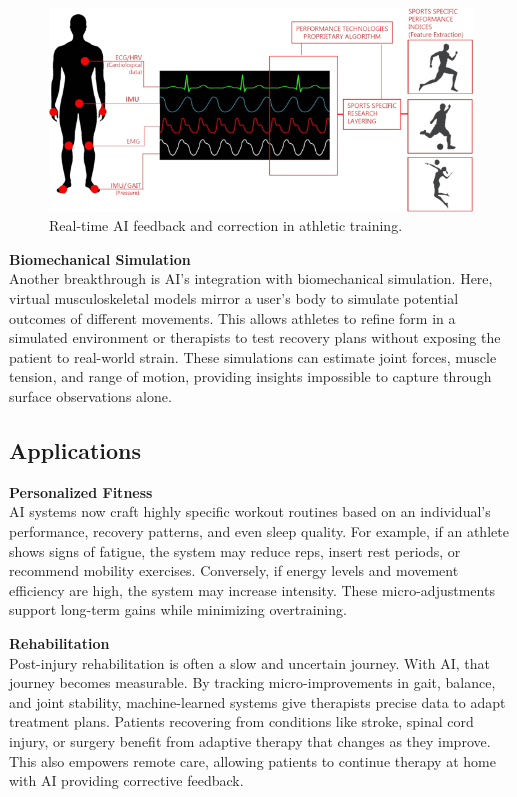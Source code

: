 \documentclass[a4paper,10pt,twocolumn]{memoir}
\newcommand{\highlight}[1]{\textcolor{accent}{\textbf{#1}}}
\newcommand{\highlight}[1]{\textcolor{accent}{\textbf{#1}}}
\begin{document}
\begin{figure}[H]
  \centering
  \includegraphics[width=\linewidth]{ai_sensors.png}
  \caption*{Real-time AI feedback and correction in athletic training.}
  \label{fig:ai_sports}
\end{figure}
\highlight{Biomechanical Simulation} \\
Another breakthrough is AI's integration with biomechanical simulation. Here, virtual musculoskeletal models mirror a user's body to simulate potential outcomes of different movements. This allows athletes to refine form in a simulated environment or therapists to test recovery plans without exposing the patient to real-world strain. These simulations can estimate joint forces, muscle tension, and range of motion, providing insights impossible to capture through surface observations alone.



\subsection*{Applications}
\highlight{Personalized Fitness} \\
AI systems now craft highly specific workout routines based on an individual's performance, recovery patterns, and even sleep quality. For example, if an athlete shows signs of fatigue, the system may reduce reps, insert rest periods, or recommend mobility exercises. Conversely, if energy levels and movement efficiency are high, the system may increase intensity. These micro-adjustments support long-term gains while minimizing overtraining.

\highlight{Rehabilitation} \\
Post-injury rehabilitation is often a slow and uncertain journey. With AI, that journey becomes measurable. By tracking micro-improvements in gait, balance, and joint stability, machine-learned systems give therapists precise data to adapt treatment plans. Patients recovering from conditions like stroke, spinal cord injury, or surgery benefit from adaptive therapy that changes as they improve. This also empowers remote care, allowing patients to continue therapy at home with AI providing corrective feedback.
\end{document}
